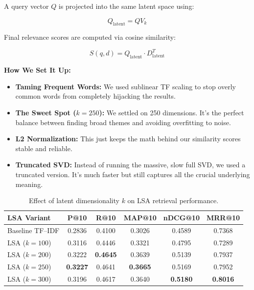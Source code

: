 \documentclass[runningheads]{llncs}
\begin{document}
A query vector $Q$ is projected into the same latent space using:

\begin{equation}
Q_{\text{latent}} = QV_k
\end{equation}

Final relevance scores are computed via cosine similarity:

\begin{equation}
S(q,d) =
Q_{\text{latent}}
\cdot
D_{\text{latent}}^T
\end{equation}

\textbf{How We Set It Up:}
\begin{itemize}
    \item \textbf{Taming Frequent Words:} We used sublinear TF scaling to stop overly common words from completely hijacking the results.
    \item \textbf{The Sweet Spot ($k = 250$):} We settled on 250 dimensions. It’s the perfect balance between finding broad themes and avoiding overfitting to noise.
    \item \textbf{L2 Normalization:} This just keeps the math behind our similarity scores stable and reliable.
    \item \textbf{Truncated SVD:} Instead of running the massive, slow full SVD, we used a truncated version. It’s much faster but still captures all the crucial underlying meaning.
\end{itemize}
\begin{table}[htbp]
\centering
\caption{Effect of latent dimensionality $k$ on LSA retrieval performance.}
\label{tab:lsa-k-tuning}
\begin{tabular}{l c c c c c}
\toprule
\textbf{LSA Variant} &
\textbf{P@10} &
\textbf{R@10} &
\textbf{MAP@10} &
\textbf{nDCG@10} &
\textbf{MRR@10} \\
\midrule
Baseline TF--IDF & 0.2836 & 0.4100 & 0.3026 & 0.4589 & 0.7368 \\
LSA ($k = 100$) & 0.3116 & 0.4446 & 0.3321 & 0.4795 & 0.7289 \\
LSA ($k = 200$) & 0.3222 & \textbf{0.4645} & 0.3639 & 0.5139 & 0.7937 \\
LSA ($k = 250$) & \textbf{0.3227} & 0.4641 & \textbf{0.3665} & 0.5169 & 0.7952 \\
LSA ($k = 300$) & 0.3196 & 0.4617 & 0.3640 & \textbf{0.5180} & \textbf{0.8016} \\
\bottomrule
\end{tabular}
\end{table}
\end{document}
